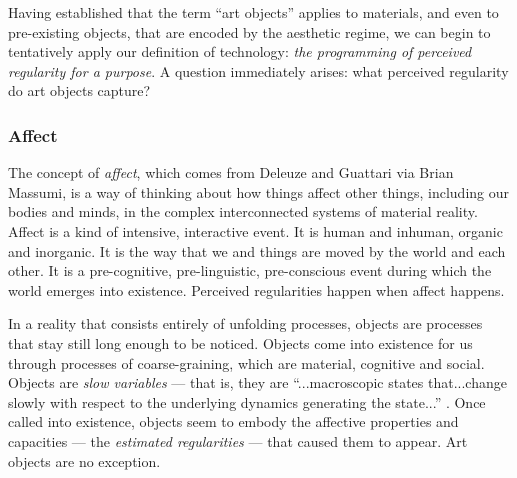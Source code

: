 \documentclass[letterpaper]{article}
\begin{document}
    Having established that the term “art objects” applies to materials, and even to pre-existing objects, that are encoded by the aesthetic regime, we can begin to tentatively apply our definition of technology: \emph{the programming of perceived regularity for a purpose}. A question immediately arises: what perceived regularity do art objects capture?

    \subsubsection{Affect}

    The concept of \emph{affect}, which comes from Deleuze and Guattari via Brian Massumi, is a way of thinking about how things affect other things, including our bodies and minds, in the complex interconnected systems of material reality. Affect is a kind of intensive, interactive event. It is human and inhuman, organic and inorganic. It is the way that we and things are moved by the world and each other. It is a pre-cognitive, pre-linguistic, pre-conscious event during which the world emerges into existence. Perceived regularities happen when affect happens.
    
    In a reality that consists entirely of unfolding processes, objects are processes that stay still long enough to be noticed. Objects come into existence for us through processes of coarse-graining, which are material, cognitive and social. Objects are \emph{slow variables} — that is, they are “...macroscopic states that...change slowly with respect to the underlying dynamics generating the state...” \citep[p.61]{FlackEtAlTmsclsSymmtryUncrtnty2013}. Once called into existence, objects seem to embody the affective properties and capacities — the \emph{estimated regularities} \citep[p.9]{FlackCrsGrnng2017} — that caused them to appear. Art objects are no exception.
\end{document}
